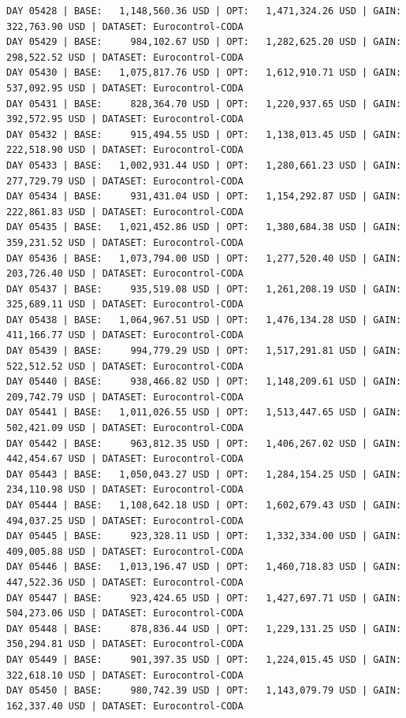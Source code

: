 \documentclass[11pt,a4paper]{article}
\begin{document}
\begin{verbatim}
DAY 05428 | BASE:   1,148,560.36 USD | OPT:   1,471,324.26 USD | GAIN: 322,763.90 USD | DATASET: Eurocontrol-CODA
DAY 05429 | BASE:     984,102.67 USD | OPT:   1,282,625.20 USD | GAIN: 298,522.52 USD | DATASET: Eurocontrol-CODA
DAY 05430 | BASE:   1,075,817.76 USD | OPT:   1,612,910.71 USD | GAIN: 537,092.95 USD | DATASET: Eurocontrol-CODA
DAY 05431 | BASE:     828,364.70 USD | OPT:   1,220,937.65 USD | GAIN: 392,572.95 USD | DATASET: Eurocontrol-CODA
DAY 05432 | BASE:     915,494.55 USD | OPT:   1,138,013.45 USD | GAIN: 222,518.90 USD | DATASET: Eurocontrol-CODA
DAY 05433 | BASE:   1,002,931.44 USD | OPT:   1,280,661.23 USD | GAIN: 277,729.79 USD | DATASET: Eurocontrol-CODA
DAY 05434 | BASE:     931,431.04 USD | OPT:   1,154,292.87 USD | GAIN: 222,861.83 USD | DATASET: Eurocontrol-CODA
DAY 05435 | BASE:   1,021,452.86 USD | OPT:   1,380,684.38 USD | GAIN: 359,231.52 USD | DATASET: Eurocontrol-CODA
DAY 05436 | BASE:   1,073,794.00 USD | OPT:   1,277,520.40 USD | GAIN: 203,726.40 USD | DATASET: Eurocontrol-CODA
DAY 05437 | BASE:     935,519.08 USD | OPT:   1,261,208.19 USD | GAIN: 325,689.11 USD | DATASET: Eurocontrol-CODA
DAY 05438 | BASE:   1,064,967.51 USD | OPT:   1,476,134.28 USD | GAIN: 411,166.77 USD | DATASET: Eurocontrol-CODA
DAY 05439 | BASE:     994,779.29 USD | OPT:   1,517,291.81 USD | GAIN: 522,512.52 USD | DATASET: Eurocontrol-CODA
DAY 05440 | BASE:     938,466.82 USD | OPT:   1,148,209.61 USD | GAIN: 209,742.79 USD | DATASET: Eurocontrol-CODA
DAY 05441 | BASE:   1,011,026.55 USD | OPT:   1,513,447.65 USD | GAIN: 502,421.09 USD | DATASET: Eurocontrol-CODA
DAY 05442 | BASE:     963,812.35 USD | OPT:   1,406,267.02 USD | GAIN: 442,454.67 USD | DATASET: Eurocontrol-CODA
DAY 05443 | BASE:   1,050,043.27 USD | OPT:   1,284,154.25 USD | GAIN: 234,110.98 USD | DATASET: Eurocontrol-CODA
DAY 05444 | BASE:   1,108,642.18 USD | OPT:   1,602,679.43 USD | GAIN: 494,037.25 USD | DATASET: Eurocontrol-CODA
DAY 05445 | BASE:     923,328.11 USD | OPT:   1,332,334.00 USD | GAIN: 409,005.88 USD | DATASET: Eurocontrol-CODA
DAY 05446 | BASE:   1,013,196.47 USD | OPT:   1,460,718.83 USD | GAIN: 447,522.36 USD | DATASET: Eurocontrol-CODA
DAY 05447 | BASE:     923,424.65 USD | OPT:   1,427,697.71 USD | GAIN: 504,273.06 USD | DATASET: Eurocontrol-CODA
DAY 05448 | BASE:     878,836.44 USD | OPT:   1,229,131.25 USD | GAIN: 350,294.81 USD | DATASET: Eurocontrol-CODA
DAY 05449 | BASE:     901,397.35 USD | OPT:   1,224,015.45 USD | GAIN: 322,618.10 USD | DATASET: Eurocontrol-CODA
DAY 05450 | BASE:     980,742.39 USD | OPT:   1,143,079.79 USD | GAIN: 162,337.40 USD | DATASET: Eurocontrol-CODA

\end{verbatim}
\end{document}
